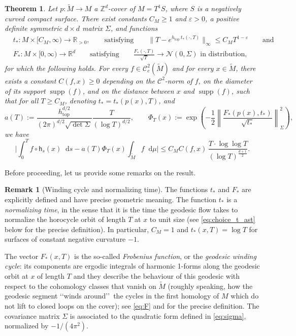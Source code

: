 \documentclass[11pt,letterpaper]{amsart}
\newcommand \R {{ \mathbb R}}
\newcommand \Z {{ \mathbb Z}}
\newcommand \tM {{\widetilde M}}
\newcommand{\horo}{\mathsf{h}}
\newcommand*{\diff}{\mathop{}\!\mathrm{d}}
\DeclareMathOperator{\topp}{top}
\DeclareMathOperator{\supp}{supp}
\newtheorem{bigthm}{Theorem}
\theoremstyle{definition}
\newtheorem{remark}[theorem]{Remark}
\begin{document}
\begin{bigthm}\label{thm:main_result}
	Let $p \colon \tM \to M$ a $\Z^d$-cover of $M = T^1S$, where $S$ is a negatively curved compact surface. There exist constants $C_M \geq 1$ and $\varepsilon >0$, a positive definite symmetric $d \times d$ matrix $\Sigma$, and functions
	\[
	\begin{split}
&t_{\ast}  \colon M \times [C_M,\infty) \to \R_{>0}, \qquad \text{satisfying} \qquad \|T-e^{h_{\topp} \, t_{\ast}(\cdot,T) }\|_{\infty} \leq C_M T^{1-\varepsilon}%
 \qquad \text{and} \\ 
&F_{\ast}\colon M \times [0,\infty) \to \R^d \qquad \text{satisfying} \qquad \frac{F_{\ast} (\cdot, T)}{\sqrt{T}} \to \mathcal{N}(0,\Sigma) \text{\ \ in distribution,}
	\end{split}
	\]
for which the following holds.
For every $f \in \mathscr{C}_c^2(\tM)$ and for every $x \in \tM$, there exists a constant $C(f,x)\geq 0$ depending on the $\mathscr{C}^2$-norm of $f$, on the diameter of its support $\supp(f)$, and on the distance between $x$ and $\supp(f)$, such that for all $T\geq C_M$, denoting $t_{\ast} = t_{\ast} (p(x),T)$, and
\begin{equation}\label{eq:a(T,x)}
a(T):=\frac{ h_{\topp}^{d/2}}{(2\pi )^{d/2}\sqrt{\det \Sigma}} 
 	\frac{T}{(\log T)^{d/2}}, \qquad \Phi_T(x):=\exp \left(-\frac{1}{2} \left\| \frac{F_{\ast}(p(x), t_{\ast} )}{\sqrt{t_{\ast}  }} \right\|_{\Sigma}^2 \right),
\end{equation}
 we have
\[
 	\Bigg\lvert \int_{0}^{T} f \circ \horo_s(x) \diff s -    
 	a(T) \Phi_T(x) \int_{\tM} f \diff \mu  \Bigg\rvert \le C_M C(f,x)  \, \frac{T \cdot \log \log T}{(\log T)^{\frac{d+1}{2}}}.
\]
\end{bigthm}
Before proceeding, let us provide some remarks on the result.



\begin{remark}[Winding cycle and normalizing time] The functions $t_{\ast}$ and $F_{\ast}$ are explicitly defined and have precise geometric meaning. The function $t_{\ast}$ is a \emph{normalizing time}, in the sense that it is the time the geodesic flow takes to normalize the horocycle orbit of length $T$ at $x$ to unit size (see \eqref{eq:choice_t_ast} below for the precise definition). In particular, $C_M=1$ and  $t_{\ast}(x,T) = \log T$ for surfaces of constant negative curvature $-1$. 

The vector $F_{\ast}(x,T)$ is the so-called \emph{Frobenius function}, or the \emph{geodesic winding cycle}: its components are ergodic integrals of harmonic 1-forms along the geodesic orbit at $x$ of length $T$ and they describe the behaviour of this geodesic with respect to the cohomology classes that vanish on $\tM$ (roughly speaking, how the geodesic segment \lq\lq winds around\rq\rq\ the cycles in the first homology of $M$ which do not lift to closed loops on the cover); see \eqref{eq:F} and  for the precise definition. The covariance matrix $\Sigma$ is associated to the quadratic form defined in \eqref{eq:sigma}, normalized by $-1/(4\pi^2)$.
\end{remark}
\end{document}
